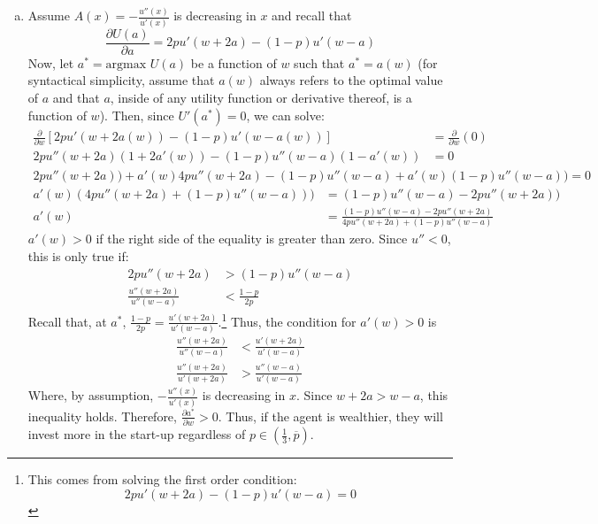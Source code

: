 \documentclass{article}
\newcommand{\olp}{\overline{p}}
\begin{document}
\begin{enumerate}[(a)]
	\item Assume $A(x)= -\frac{u''(x)}{u'(x)}$ is decreasing in $x$ and recall that 
		\[
			\frac{\partial U(a)}{\partial a} = 2pu'(w+2a) - (1-p)u'(w-a)
		\]
		Now, let $a^*=\text{argmax }U(a)$ be a function of $w$ such that $a^*=a(w)$ (for syntactical simplicity, assume that $a(w)$ always refers to the optimal value of $a$ and that $a$, inside of any utility function or derivative thereof, is a function of $w$). Then, since $U'(a^*)=0$, we can solve:
		\begin{align*}
			\frac{\partial}{\partial w}\left[ 2pu'(w+2a(w)) - (1-p)u'(w-a(w)) \right] &= \frac{\partial}{\partial w}(0)	\\
			2pu''(w+2a)(1+2a'(w)) - (1-p)u''(w-a)(1-a'(w)) &= 0	
		\end{align*}
		\begin{align*}
			2pu''(w+2a)) + a'(w)4pu''(w+2a) - (1-p)u''(w-a) + a'(w)(1-p)u''(w-a)) = 0
		\end{align*}
		\begin{align*}
			a'(w)(4pu''(w+2a)+(1-p)u''(w-a))) &=  (1-p)u''(w-a) - 2pu''(w+2a)) \\
			a'(w) &= \frac{(1-p)u''(w-a) - 2pu''(w+2a)}{4pu''(w+2a)+(1-p)u''(w-a)}
		\end{align*}
		$a'(w)>0$ if the right side of the equality is greater than zero. Since $u''<0$, this is only true if:
		\begin{align*}
			2pu''(w+2a) &> (1-p)u''(w-a)	\\
			\frac{u''(w+2a)}{u''(w-a)} &< \frac{1-p}{2p}
		\end{align*}
		Recall that, at $a^*$, ${\frac{1-p}{2p} = \frac{u'(w+2a)}{u'(w-a)}}$.\footnote{This comes from solving the first order condition: \[ 2pu'(w+2a) - (1-p)u'(w-a)=0 \]} Thus, the condition for $a'(w)>0$ is
		\begin{align*}
			\frac{u''(w+2a)}{u''(w-a)} &< \frac{u'(w+2a)}{u'(w-a)}	\\
			\frac{u''(w+2a)}{u'(w+2a)} &> \frac{u''(w-a)}{u'(w-a)}
		\end{align*}
		Where, by assumption, $-\frac{u''(x)}{u'(x)}$ is decreasing in $x$. Since ${w+2a>w-a}$, this inequality holds. Therefore, ${\frac{\partial a^*}{\partial w}>0}$. Thus, if the agent is wealthier, they will invest more in the start-up regardless of ${p\in(\frac{1}{3},\olp)}$.
		
\end{enumerate}


\end{document}
